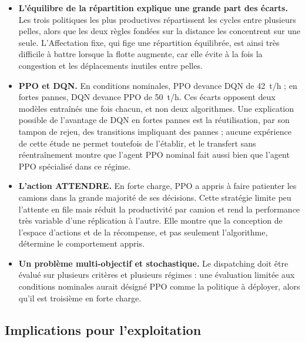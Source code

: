 \documentclass[11pt,a4paper]{article}
\newif\ifrevmarks
\newcommand{\revtag}[1]{\ifrevmarks\textsuperscript{\textcolor{red!70!black}{\scriptsize[#1]}}\fi}
\newenvironment{revbloc}[1]{\par\ifrevmarks\color{revcolor}\noindent\revtag{#1}\ \fi}{\par}
\begin{document}
\begin{revbloc}{M14, M16, M18, M27}
\begin{itemize}
  \item \textbf{L'équilibre de la répartition explique une grande part des écarts.} Les trois politiques les plus productives répartissent les cycles entre plusieurs pelles, alors que les deux règles fondées sur la distance les concentrent sur une seule. L'Affectation fixe, qui fige une répartition équilibrée, est ainsi très difficile à battre lorsque la flotte augmente, car elle évite à la fois la congestion et les déplacements inutiles entre pelles.
  \item \textbf{PPO et DQN.} En conditions nominales, PPO devance DQN de 42~t/h ; en fortes pannes, DQN devance PPO de 50~t/h. Ces écarts opposent deux modèles entraînés une fois chacun, et non deux algorithmes. Une explication possible de l'avantage de DQN en fortes pannes est la réutilisation, par son tampon de rejeu, des transitions impliquant des pannes ; aucune expérience de cette étude ne permet toutefois de l'établir, et le transfert sans réentraînement montre que l'agent PPO nominal fait aussi bien que l'agent PPO spécialisé dans ce régime.
  \item \textbf{L'action ATTENDRE.} En forte charge, PPO a appris à faire patienter les camions dans la grande majorité de ses décisions. Cette stratégie limite peu l'attente en file mais réduit la productivité par camion et rend la performance très variable d'une réplication à l'autre. Elle montre que la conception de l'espace d'actions et de la récompense, et pas seulement l'algorithme, détermine le comportement appris.
  \item \textbf{Un problème multi-objectif et stochastique.} Le dispatching doit être évalué sur plusieurs critères et plusieurs régimes : une évaluation limitée aux conditions nominales aurait désigné PPO comme la politique à déployer, alors qu'il est troisième en forte charge.
\end{itemize}
\end{revbloc}

\subsection{Implications pour l'exploitation}
\end{document}
